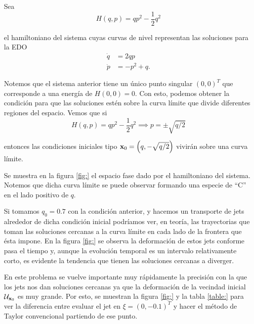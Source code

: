 Sea 
\begin{equation}
 H(q,p) = qp^2 - \frac{1}{2}q^2
 \label{eq:artificial_ham}
\end{equation}

el hamiltoniano del sistema cuyas curvas de nivel representan las soluciones para la EDO
\begin{align}
 \dot{q} &= 2qp \nonumber \\
 \dot{p} &= -p^2 + q.
 \label{eq:artificial_ode}
\end{align}

Notemos que el sistema anterior tiene un único punto singular $(0,0)^T$ que corresponde a una energía de $H(0,0) = 0$. Con esto, podemos obtener la condición para que las soluciones estén sobre la curva límite que divide diferentes regiones del espacio. Vemos que si
\begin{equation*}
 H(q,p) = qp^2 - \frac{1}{2}q^2 \implies p = \pm \sqrt{q/2} 
\end{equation*}

entonces las condiciones iniciales tipo $\mathbf{x}_0 = \left( q, -\sqrt{q/2} \right)$ vivirán sobre una curva límite. 

Se muestra en la figura \ref{fig:} el espacio fase dado por el hamiltoniano del sistema. Notemos que dicha curva límite se puede observar formando una especie de ``C'' en el lado positivo de $q$.


Si tomamos $q_0 = 0.7$ con la condición anterior, y hacemos un transporte de jets alrededor de dicha condición inicial podríamos ver, en teoría, las trayectorias que toman las soluciones cercanas a la curva límite en cada lado de la frontera que ésta impone. En la figura \ref{fig:} se observa la deformación de estos jets conforme pasa el tiempo y, aunque la evolución temporal es un intervalo relativamente corto, es evidente la tendencia que tienen las soluciones cercanas a diverger.


En este problema se vuelve importante muy rápidamente la precisión con la que los jets nos dan soluciones cercanas ya que la deformación de la vecindad inicial $\mathcal{U}_{\mathbf{x}_0}$ es muy grande. Por esto, se muestran la figura \ref{fig:} y la tabla \ref{table:} para ver la diferencia entre evaluar el jet en $\xi = (0,-0.1)^T$ y hacer el método de Taylor convencional partiendo de ese punto. 



